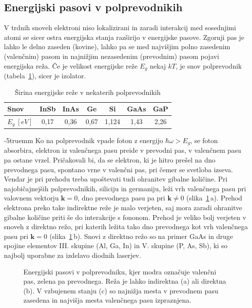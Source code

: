 \subsection*{Energijski pasovi v polprevodnikih}
V trdnih snoveh elektroni niso lokalizirani in zaradi interakcij med sosednjimi atomi
se sicer ostra energijska stanja razširijo v energijske pasove. Zgornji pas je lahko 
le delno zaseden (kovine), lahko pa se med najvišjim polno zasedenim 
(valenčnim) pasom in najnižjim nezasedenim (prevodnim) pasom pojavi energijska reža. 
Če je velikost energijske reže $E_g$ nekaj $kT$, je snov polprevodnik 
(tabela~\ref{table:gap}), sicer je izolator.
\begin{table}[h]
 \centering
\begin{tabular}{|l|c|c|c|c|c|c|} \hline  
      Snov & InSb & InAs & Ge & Si & GaAs & GaP \\ \hline
      $E_g~[\si{eV}]$ & 0,17 & 0,36 & 0,67 & 1,124 & 1,43 & 2,26  \\ \hline  
\end{tabular}
  \caption{Širina energijske reže v nekaterih polprevodnikih}
\label{table:gap}
\end{table}
\vglue-5truemm
Ko na polprevodnik vpade foton z energijo $\hbar\omega > E_g$, se foton absorbira, elektron
iz valenčnega pasu preide v prevodni pas, v valenčnem pasu pa ostane vrzel. Pričakovali bi, 
da se elektron, ki je hitro prešel na dno prevodnega pasu, spontano vrne v valenčni 
pas, pri čemer se svetloba izseva. Vendar je pri 
prehodu treba upoštevati tudi ohranitev gibalne količine. Pri najobičajnejših polprevodnikih, 
siliciju in germaniju, leži vrh valenčnega pasu pri valovnem vektorju $\mathbf{k}=0$, 
dno prevodnega pasu pa pri $\mathbf{k} \neq 0$ (slika~\ref{fig:Ek}\,a).
Prehod elektrona preko take indirektne reže je malo verjeten, saj mora zaradi ohranitve 
gibalne količine priti še do interakcije s fononom. Prehod je veliko bolj verjeten v 
snoveh z direktno režo, pri katerih ležita tako dno prevodnega kot vrh valenčnega pasu 
pri $\mathbf{k}=0$ (slika~\ref{fig:Ek}\,b). Snovi z direktno režo so na primer GaAs in 
druge spojine elementov III. skupine (Al, Ga, In) in V. skupine (P, As, Sb), ki so najbolj 
uporabne za izdelavo diodnih laserjev.
\begin{figure}[h]
\centering
\def\svgwidth{145truemm} 

\caption{Energijski pasovi v polprevodniku, kjer modra označuje valenčni pas, 
zelena pa prevodnega. Reža je lahko indirektna (a) ali direktna (b). V vzbujenem stanju (c) so 
najnižja mesta v prevodnem pasu zasedena in najvišja mesta valenčnega pasu
izpraznjena. 
}
\label{fig:Ek}
\end{figure}

